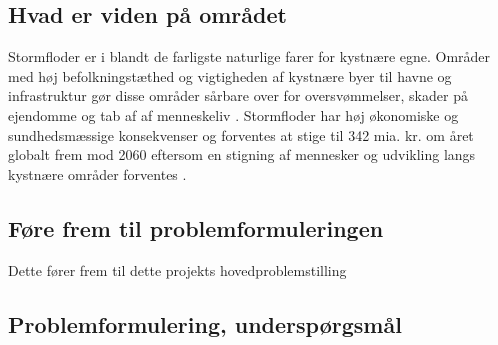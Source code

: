 
\subsection{Hvad er viden på området} %

Stormfloder er i blandt de farligste naturlige farer for kystnære egne. Områder med høj befolkningstæthed og vigtigheden af kystnære byer til havne og infrastruktur gør disse områder sårbare over for oversvømmelser, skader på ejendomme og tab af af menneskeliv \citep{kaniewski_solar_2016}. Stormfloder har høj økonomiske og sundhedsmæssige konsekvenser og forventes at stige til 342 mia. kr. om året globalt frem mod 2060 eftersom en stigning af mennesker og udvikling langs kystnære områder forventes \citep{kaniewski_solar_2016,hallegatte_future_2013}.\\





\subsection{Føre frem til problemformuleringen}

Dette fører frem til dette projekts hovedproblemstilling 

\subsection{Problemformulering, underspørgsmål}
\begin{center}
\end{center}

